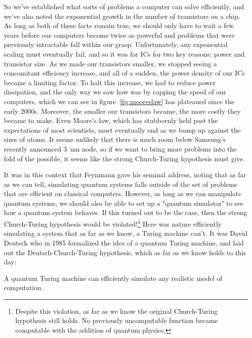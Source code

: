 So we've established what sorts of problems a computer can solve efficiently, and we've also noted the
exponential growth in the number of transistors on a chip. As long as both of these facts remain true, we
should only have to wait a few years before our computers become twice as powerful and problems that were
previously intractable fall within our grasp. Unfortunately, any exponential scaling must eventually fail,
and so it was for ICs for two key reasons: power and transistor size. As we made our transistors smaller,
we stopped seeing a concomitant efficiency increase, and all of a sudden, the power density of our ICs 
became a limiting factor. To halt this increase, we had to reduce power dissipation, and the
only way we saw how was by capping the speed of our computers, which we can see in figure~\ref{fig:mooreslaw} 
has plateaued since the early 2000s. Moreover, the smaller our transistors became, the more costly they became 
to make. Even Moore's law, which has stubbornly held past the expectations of most scientists, must eventually
end as we bump up against the sizes of atoms. It seems unlikely that there is much room below Samsung's 
recently announced \SI{3}{\nano\meter} node, so if we want to bring more problems into the fold of the
possible, it seems like the strong Church-Turing hypothesis must give.

It was in this context that Feynmann gave his seminal address, noting that as far as we can tell, simulating
quantum systems falls outside of the set of problems that are efficient on classical computers\cite{Feynman1982}. 
However, as long as we can manipulate quantum systems, we should also be able to set up a "quantum
simulator" to see how a quantum system behaves. If this turned out to be the case, then the strong 
Church-Turing hypothesis would be violated!\footnote{Despite this violation, as far as we know the original
Church-Turing hypothesis still holds. No previously uncomputable function became computable with the addition
of quantum physics.} Here was nature efficiently simulating a system that as far as we know, a Turing machine 
can't. It was David Deutsch who in 1985 formalized the idea of a quantum Turing machine\cite{doi:10.1098/rspa.1985.0070}, 
and laid out the Deutsch-Church-Turing hypothesis, which as far as we know holds to this day:

\begin{displayquote}
  A quantum Turing machine can efficiently simulate any realistic model of computation.
\end{displayquote}

